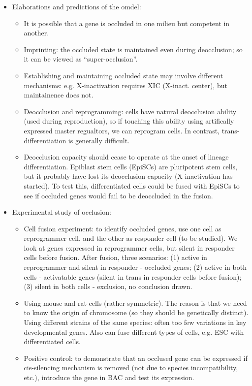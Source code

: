 \documentclass{report}
\begin{document}
\begin{itemize}
	\item Elaborations and predictions of the omdel: 
	\begin{itemize}
		\item It is possible that a gene is occluded in one milieu but competent in another. 
		\item Imprinting: the occluded state is maintained even during deocclusion; so it can be viewed as ``super-occlusion''. 
		\item Establishing and maintaining occluded state may involve different mechanisms: e.g. X-inactivation requires XIC (X-inact. center), but maintainence does not.
		\item Deocclusion and reprogramming: cells have natural deocclusion ability (used during reproduction), so if touching this ability using artifically expressed master regualtors, we can reprogram cells. In contrast, trans-differentiation is generally difficult.  
		\item Deocclusion capacity should cease to operate at the onset of lineage differentiation. Epiblast stem cells (EpiSCs) are pluripotent stem cells, but it probably have lost its deocclusion capacity (X-inactivation has started). To test this, differentiated cells could be fused with EpiSCs to see if occluded genes would fail to be deoccluded in the fusion. 
	\end{itemize}
	\item Experimental study of occlusion:
	\begin{itemize}
		\item Cell fusion experiment: to identify occluded genes, use one cell as reprogrammer cell, and the other as responder cell (to be studied). We look at genes expressed in reprogrammer cells, but silent in responder cells before fusion. After fusion, three scenarios: (1) active in reprogrammer and silent in responder - occluded genes; (2) active in both cells - activatable genes (silent in trans in responder cells before fusion); (3) silent in both cells - exclusion, no conclusion drawn.
		\item Using mouse and rat cells (rather symmetric). The reason is that we need to know the origin of chromosome (so they should be genetically distinct). Using different strains of the same species: often too few variations in key developmental genes. Also can fuse different types of cells, e.g. ESC with differentiated cells. 
		\item Positive control: to demonstrate that an occlused gene can be expressed if cis-silencing mechanism is removed (not due to species incompatibility, etc.), introduce the gene in BAC and test its expression. 

\end{itemize}
\end{itemize}
\end{document}
